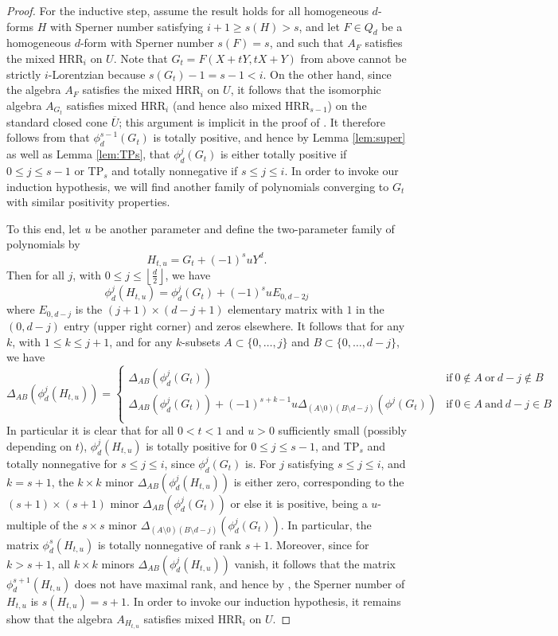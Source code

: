 \documentclass[unnumsec,webpdf,modern,medium]{oup-authoring-template}
\newcommand{\flo}[1]{\left\lfloor\frac{#1}{2}\right\rfloor}
\theoremstyle{theorem}
\theoremstyle{definition}
\begin{document}
\begin{proof}
	For the inductive step, assume the result holds for all homogeneous $d$-forms $H$ with Sperner number satisfying $i+1\geq s(H)>s$, and let $F\in Q_d$ be a homogeneous $d$-form with Sperner number $s(F)=s$, and such that $A_F$ satisfies the mixed HRR$_i$ on $U$. Note that $G_t=F(X+tY,tX+Y)$ from above cannot be strictly $i$-Lorentzian because $s(G_t)-1=s-1< i$.  On the other hand, since the algebra $A_F$ satisfies the mixed HRR$_i$ on $U$, it follows that the isomorphic algebra $A_{G_t}$ satisfies mixed HRR$_i$ (and hence also mixed HRR$_{s-1}$) on the standard closed cone $\overline{U}$; this argument is implicit in the proof of \cite[Corollary 4.13]{MMS}.  It therefore follows from \cite[Theorem 1]{MMS} that $\phi^{s-1}_d(G_t)$ is totally positive, and hence by Lemma \ref{lem:super} as well as Lemma \ref{lem:TPs}, that $\phi^{j}_d(G_t)$ is either totally positive if $0\leq j\leq s-1$ or TP$_s$ and totally nonnegative if $s\leq j\leq i$.  In order to invoke our induction hypothesis, we will find another family of polynomials converging to $G_t$ with similar positivity properties.  
	
	To this end, let $u$ be another parameter and define the two-parameter family of polynomials by 
	$$H_{t,u}=G_t+(-1)^suY^d.$$
	Then for all $j$, with $0\leq j\leq\flo{d}$, we have 
	$$\phi^j_d(H_{t,u})=\phi^j_d(G_t)+(-1)^suE_{0,d-2j}$$
	where $E_{0,d-j}$ is the $(j+1)\times (d-j+1)$ elementary matrix with $1$ in the $(0,d-j)$ entry (upper right corner) and zeros elsewhere.  It follows that for any $k$, with $1\leq k\leq j+1$, and for any $k$-subsets $A\subset\{0,\ldots,j\}$ and $B\subset\{0,\ldots,d-j\}$, we have  
	$$\Delta_{AB}\left(\phi^j_d(H_{t,u})\right)=\begin{cases} \Delta_{AB}\left(\phi^j_d(G_t)\right) & \text{if} \ 0\notin A \ \text{or} \ d-j\notin B\\
		\Delta_{AB}\left(\phi^j_d(G_t)\right)+(-1)^{s+k-1}u\Delta_{(A\setminus 0) (B\setminus d-j)}\left(\phi^j(G_t)\right) & \text{if} \ 0\in A \ \text{and} \ d-j\in B\\ \end{cases}$$
	In particular it is clear that for all $0<t<1$ and ${u>0}$ sufficiently small (possibly depending on $t$), $\phi^j_d(H_{t,u})$ is totally positive for $0\leq j\leq s-1$, and TP$_s$ and totally nonnegative for $s\leq j\leq i$, since $\phi^j_d(G_t)$ is.  For $j$ satisfying $s\leq j\leq i$, and $k=s+1$, the $k\times k$ minor $\Delta_{AB}(\phi^j_d(H_{t,u}))$ is either zero, corresponding to the $(s+1)\times (s+1)$ minor $\Delta_{AB}(\phi^j_d(G_t))$ or else it is positive, being a $u$-multiple of the $s\times s$ minor $\Delta_{(A\setminus 0)(B\setminus d-j)}(\phi^j_d(G_t))$.  In particular, the matrix $\phi^s_d(H_{t,u})$ is totally nonnegative of rank $s+1$.  Moreover, since for $k>s+1$, all $k\times k$ minors $\Delta_{AB}(\phi^j_d(H_{t,u}))$ vanish, it follows that the matrix $\phi^{s+1}_d(H_{t,u})$ does not have maximal rank, and hence by \cite[Lemma 4.5]{MMS}, the Sperner number of $H_{t,u}$ is $s(H_{t,u})=s+1$.  In order to invoke our induction hypothesis, it remains show that the algebra $A_{H_{t,u}}$ satisfies mixed HRR$_i$ on $U$. 
	

\end{proof}
\end{document}
